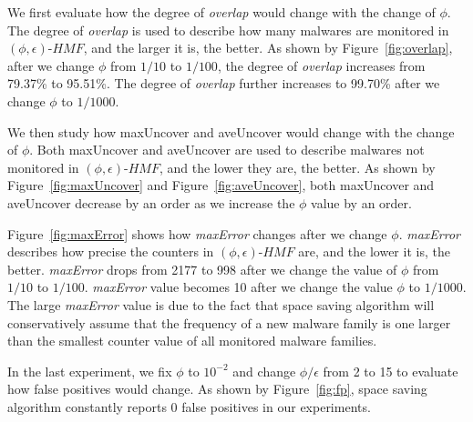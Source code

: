 We first evaluate how the degree of \textit{overlap} would change with the change of $\phi$. 
The degree of \textit{overlap} is used to describe how many malwares are monitored in $(\phi, \epsilon)\mbox{-}HMF$, and the larger it is, the better. 
As shown by Figure~\ref{fig:overlap}, after we change $\phi$ from $1/10$ to $1/100$, the degree of \textit{overlap} increases from 79.37\% to 95.51\%. 
The degree of \textit{overlap} further increases to 99.70\% after we change $\phi$ to $1/1000$. 

We then study how maxUncover and aveUncover would change with the change of $\phi$.
Both maxUncover and aveUncover are used to describe malwares not monitored in $(\phi, \epsilon)\mbox{-}HMF$, 
and the lower they are, the better. 
As shown by Figure~\ref{fig:maxUncover} and Figure~\ref{fig:aveUncover}, 
both maxUncover and aveUncover decrease by an order as we increase the $\phi$ value by an order. 

Figure~\ref{fig:maxError} shows how \textit{maxError} changes after we change $\phi$. 
\textit{maxError} describes how precise the counters in $(\phi, \epsilon)\mbox{-}HMF$ are, 
and the lower it is, the better. \textit{maxError} drops from 2177 to 998 
after we change the value of $\phi$ from $1/10$ to $1/100$. 
\textit{maxError} value becomes 10 after we change the value $\phi$ to $1/1000$. 
The large \textit{maxError} value is due to the fact that space saving algorithm 
will conservatively assume that the frequency of a new malware family is one larger than the smallest counter value of all monitored malware families. 

In the last experiment, we fix $\phi$ to $10^{-2}$ 
and change $\phi/\epsilon$ from 2 to 15 to evaluate how false positives would change. 
As shown by Figure~\ref{fig:fp}, space saving algorithm constantly reports 0 false positives in our experiments. 

